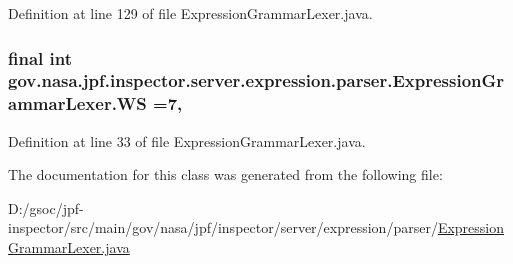 Definition at line 129 of file Expression\+Grammar\+Lexer.\+java.

\subsubsection[{\texorpdfstring{WS}{WS}}]{\setlength{\rightskip}{0pt plus 5cm}final int gov.\+nasa.\+jpf.\+inspector.\+server.\+expression.\+parser.\+Expression\+Grammar\+Lexer.\+WS =7\hspace{0.3cm}{\ttfamily [static]}, {\ttfamily [package]}}\hypertarget{classgov_1_1nasa_1_1jpf_1_1inspector_1_1server_1_1expression_1_1parser_1_1_expression_grammar_lexer_abe9eb2f862f31836ed276fb1fb5fe35f}{}\label{classgov_1_1nasa_1_1jpf_1_1inspector_1_1server_1_1expression_1_1parser_1_1_expression_grammar_lexer_abe9eb2f862f31836ed276fb1fb5fe35f}


Definition at line 33 of file Expression\+Grammar\+Lexer.\+java.



The documentation for this class was generated from the following file\+:\begin{DoxyCompactItemize}
\item 
D\+:/gsoc/jpf-\/inspector/src/main/gov/nasa/jpf/inspector/server/expression/parser/\hyperlink{_expression_grammar_lexer_8java}{Expression\+Grammar\+Lexer.\+java}\end{DoxyCompactItemize}
